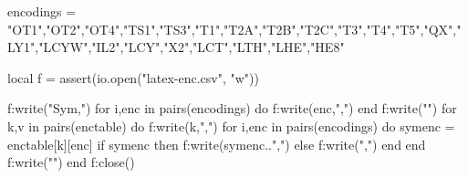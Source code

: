 \documentclass{article}
\begin{document}
\endgroup


\begin{luacode*}
encodings = {"OT1","OT2","OT4","TS1","TS3","T1","T2A","T2B","T2C","T3","T4","T5","QX","LY1","LCYW","IL2","LCY","X2","LCT","LTH","LHE","HE8"}

local f = assert(io.open("latex-enc.csv", "w"))

f:write("Sym,")
for i,enc in pairs(encodings) do
  f:write(enc,",")
end
f:write("\n")
for k,v in pairs(enctable) do
  f:write(k,",")
  for i,enc in pairs(encodings) do
    symenc = enctable[k][enc]
    if symenc then
      f:write(symenc..",")
    else
      f:write(",")
    end
  end
  f:write("\n")
end
f:close()

\end{luacode*}
\end{document}
